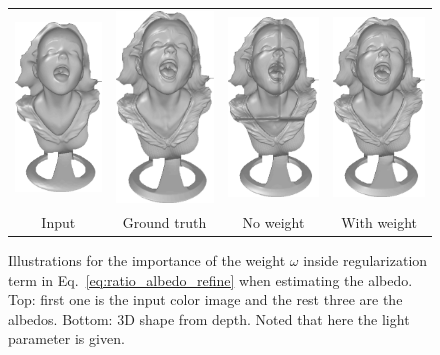 \begin{figure}[!ht]
{\begin{tabular}{c|c c c}
   \includegraphics[height = 0.32\linewidth]{figures/methodology/ratio_syn_shapeInput.pdf} \hspace{0.1em}
   &\hspace{0.1em}
   \includegraphics[height = 0.32\linewidth]{figures/methodology/ratio_syn_shapeGT.pdf} &
   \includegraphics[height = 0.32\linewidth]{figures/methodology/ratio_syn_shapeNR.pdf} &
   \includegraphics[height = 0.32\linewidth]{figures/methodology/ratio_syn_shapeR.pdf} \\
   {Input} & {Ground truth} & {No weight} &{With weight}                 
 \end{tabular}}
\caption{Illustrations for the importance of the weight $\omega$ inside regularization term in Eq.~\ref{eq:ratio_albedo_refine} when estimating the albedo. Top: first one is the input color image and the rest three are the albedos. Bottom: 3D shape from depth. Noted that here the light parameter is given.}
\label{fig:ratio_albedo_demo}
\end{figure}


